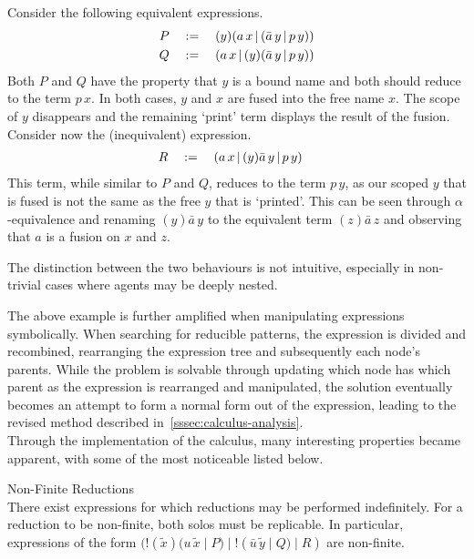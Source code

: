         \begin{example*}
            Consider the following equivalent expressions.
            \begin{align*}
                P \quad & := \quad (y)(a \, x \,|\, (\bar{a} \, y \,|\, p \, y)) \\
                Q \quad & := \quad (a \, x \,|\, (y)(\bar{a} \, y \,|\, p \, y))
            \end{align*}
            Both $P$ and $Q$ have the property that $y$ is a bound name and both should reduce to the term $p \, x$.
            In both cases, $y$ and $x$ are fused into the free name $x$. The scope of $y$ disappears and the remaining `print' term displays the result of the fusion.
            Consider now the (inequivalent) expression.
            \begin{align*}
                R \quad & := \quad (a \, x \, | \, (y)\bar{a} \, y \, | \, p \, y)
            \end{align*}
            This term, while similar to $P$ and $Q$, reduces to the term $p \, y$, as our scoped $y$ that is fused is not the same as the free $y$ that is `printed'.
            This can be seen through $\alpha$-equivalence and renaming $(y)\bar{a} \, y$ to the equivalent term $(z)\bar{a} \, z$ and observing that $a$ is a fusion on $x$ and $z$.

            The distinction between the two behaviours is not intuitive, especially in non-trivial cases where agents may be deeply nested.
        \end{example*}

        The above example is further amplified when manipulating expressions symbolically.
        When searching for reducible patterns, the expression is divided and recombined, rearranging the expression tree and subsequently each node's parents.
        While the problem is solvable through updating which node has which parent as the expression is rearranged and manipulated, the solution eventually becomes an attempt to form a normal form out of the expression, leading to the revised method described in~\ref{sssec:calculus-analysis}.\\

        Through the implementation of the calculus, many interesting properties became apparent, with some of the most noticeable listed below.

        \begin{lemma*}{Non-Finite Reductions\\}
            There exist expressions for which reductions may be performed indefinitely.
            For a reduction to be non-finite, both solos must be replicable.
            In particular, expressions of the form $(!(\tilde{x})(u \, \tilde{x} \; | \; P) \; | \; !(\bar{u} \, \tilde{y} \; | \; Q) \; | \; R)$ are non-finite.
        \end{lemma*}

